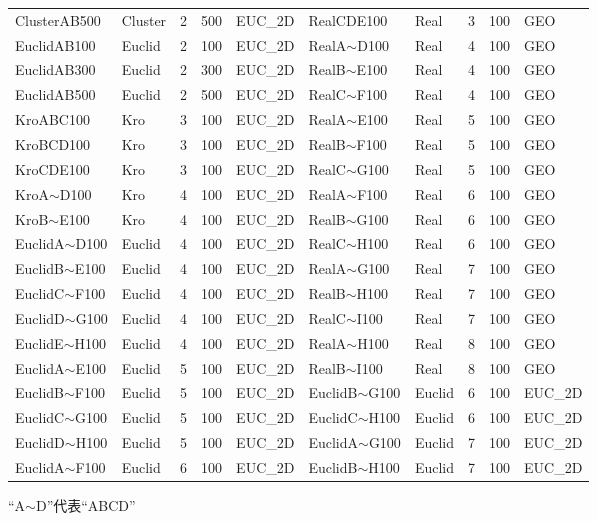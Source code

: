 \begin{table}[h]
\begin{threeparttable}
\begin{tabular}{llcll|llcll}
        ClusterAB500 & Cluster & 2     & 500   & EUC\_2D & RealCDE100 & Real  & 3     & 100   & GEO \\
        EuclidAB100 & Euclid & 2     & 100   & EUC\_2D & RealA$\sim$D100 & Real  & 4     & 100   & GEO \\
        EuclidAB300 & Euclid & 2     & 300   & EUC\_2D & RealB$\sim$E100 & Real  & 4     & 100   & GEO \\
        EuclidAB500 & Euclid & 2     & 500   & EUC\_2D & RealC$\sim$F100 & Real  & 4     & 100   & GEO \\
        KroABC100 & Kro   & 3     & 100   & EUC\_2D & RealA$\sim$E100 & Real  & 5     & 100   & GEO \\
        KroBCD100 & Kro   & 3     & 100   & EUC\_2D & RealB$\sim$F100 & Real  & 5     & 100   & GEO \\
        KroCDE100 & Kro   & 3     & 100   & EUC\_2D & RealC$\sim$G100 & Real  & 5     & 100   & GEO \\
        KroA$\sim$D100 & Kro   & 4     & 100   & EUC\_2D & RealA$\sim$F100 & Real  & 6     & 100   & GEO \\
        KroB$\sim$E100 & Kro   & 4     & 100   & EUC\_2D & RealB$\sim$G100 & Real  & 6     & 100   & GEO \\
        EuclidA$\sim$D100 & Euclid & 4     & 100   & EUC\_2D & RealC$\sim$H100 & Real  & 6     & 100   & GEO \\
        EuclidB$\sim$E100 & Euclid & 4     & 100   & EUC\_2D & RealA$\sim$G100 & Real  & 7     & 100   & GEO \\
        EuclidC$\sim$F100 & Euclid & 4     & 100   & EUC\_2D & RealB$\sim$H100 & Real  & 7     & 100   & GEO \\
        EuclidD$\sim$G100 & Euclid & 4     & 100   & EUC\_2D & RealC$\sim$I100 & Real  & 7     & 100   & GEO \\
        EuclidE$\sim$H100 & Euclid & 4     & 100   & EUC\_2D & RealA$\sim$H100 & Real  & 8     & 100   & GEO \\
        EuclidA$\sim$E100 & Euclid & 5     & 100   & EUC\_2D & RealB$\sim$I100 & Real  & 8     & 100   & GEO \\
        EuclidB$\sim$F100 & Euclid & 5     & 100   & EUC\_2D & EuclidB$\sim$G100 & Euclid & 6     & 100   & EUC\_2D \\
        EuclidC$\sim$G100 & Euclid & 5     & 100   & EUC\_2D & EuclidC$\sim$H100 & Euclid & 6  & 100   & EUC\_2D  \\
        EuclidD$\sim$H100 & Euclid & 5     & 100   & EUC\_2D & EuclidA$\sim$G100 & Euclid & 7  & 100   & EUC\_2D  \\
        EuclidA$\sim$F100 & Euclid & 6     & 100   & EUC\_2D & EuclidB$\sim$H100 & Euclid & 7  & 100   & EUC\_2D  \\
        \bottomrule
    \end{tabular}
    \begin{tablenotes}
        \item[] “A$\sim$D”代表“ABCD”
    \end{tablenotes}
    \end{threeparttable}
\end{table}
